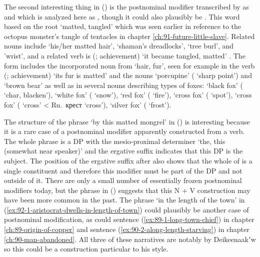 The second interesting thing in (\lastx) is the postnominal modifier transcribed by \citeauthor{swanton:1909} as  and which is analyzed here as , though it could also plausibly be .
This word based on the root  ‘matted, tangled’ \parencites[f04/47–48]{leer:1973}[748]{leer:1976}[64]{leer:1978b} which was seen earlier in reference to the octopus monster’s tangle of tentacles in chapter \ref{ch:91-future-little-slave}.
Related nouns include
 ‘his/her matted hair’,
 ‘shaman’s dreadlocks’,
 ‘tree burl’,
and  ’wrist’,
and a related verb is
 (; achievement) ‘it became tangled, matted’ \parencite[f04/47–48]{leer:1973}.
The form  includes the incorporated noun  from  ‘hair, fur’, seen for example in the verb  (; achievement) ‘its fur is matted’ and the nouns  ‘porcupine’ ( ‘sharp point’) and  ‘brown bear’ as well as in several nouns describing types of foxes:
 ‘black fox’ ( ‘char, blacken’),
 ‘white fox’ ( ‘snow’),
 ‘red fox’ ( ‘fire’),
 ‘cross fox’ ( ‘spot’),
 ‘cross fox’ ( ‘cross’ < Ru.\ крест  ‘cross’),
 ‘silver fox’ ( ‘frost’).

The structure of the phrase  ‘by this matted mongrel’ in (\lastx) is interesting because it is a rare case of a postnominal modifier apparently constructed from a verb.
The whole phrase is a DP with the mesio-proximal determiner  ‘the, this (somewhat near speaker)’ and the ergative suffix  indicates that this DP is the subject.
The position of the ergative suffix after  also shows that the whole of  is a single constituent and therefore this modifier must be part of the DP and not outside of it.
There are only a small number of essentially frozen postnominal modifiers today, but the phrase in (\lastx) suggests that this N + V construction may have been more common in the past.
The phrase  ‘in the length of the town’ in (\ref{ex:92-1-aristocrat-dwells-in-length-of-town}) could plausibly be another case of postnominal modification, as could sentence (\ref{ex:89-1-long-town-chief}) in chapter \ref{ch:89-origin-of-copper} and sentence (\ref{ex:90-2-along-length-starving}) in chapter \ref{ch:90-man-abandoned}.
All three of these narratives are notably by Deikeenaakʼw so this could be a construction particular to his style.

